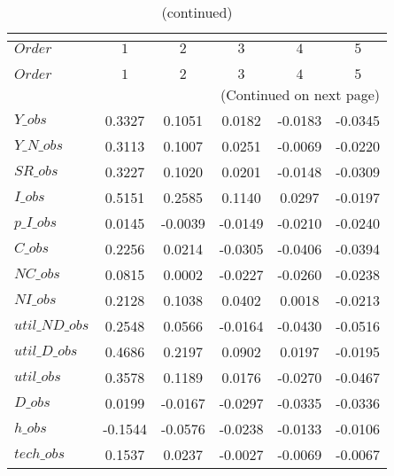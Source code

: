  
\begin{center}
\begin{longtable}{lccccc} 
\caption{COEFFICIENTS OF AUTOCORRELATION}\\
 \label{Table:th_autocorr_matrix}\\
\toprule 
$Order          $	 & 	 $          1$	 & 	 $          2$	 & 	 $          3$	 & 	 $          4$	 & 	 $          5$\\
\midrule \endfirsthead 
\caption{(continued)}\\
 \toprule \\ 
$Order          $	 & 	 $          1$	 & 	 $          2$	 & 	 $          3$	 & 	 $          4$	 & 	 $          5$\\
\midrule \endhead 
\midrule \multicolumn{6}{r}{(Continued on next page)} \\ \bottomrule \endfoot 
\bottomrule \endlastfoot 
$Y\_obs         $	 & 	     0.3327	 & 	     0.1051	 & 	     0.0182	 & 	    -0.0183	 & 	    -0.0345 \\ 
$Y\_N\_obs      $	 & 	     0.3113	 & 	     0.1007	 & 	     0.0251	 & 	    -0.0069	 & 	    -0.0220 \\ 
$SR\_obs        $	 & 	     0.3227	 & 	     0.1020	 & 	     0.0201	 & 	    -0.0148	 & 	    -0.0309 \\ 
$I\_obs         $	 & 	     0.5151	 & 	     0.2585	 & 	     0.1140	 & 	     0.0297	 & 	    -0.0197 \\ 
$p\_I\_obs      $	 & 	     0.0145	 & 	    -0.0039	 & 	    -0.0149	 & 	    -0.0210	 & 	    -0.0240 \\ 
$C\_obs         $	 & 	     0.2256	 & 	     0.0214	 & 	    -0.0305	 & 	    -0.0406	 & 	    -0.0394 \\ 
$NC\_obs        $	 & 	     0.0815	 & 	     0.0002	 & 	    -0.0227	 & 	    -0.0260	 & 	    -0.0238 \\ 
$NI\_obs        $	 & 	     0.2128	 & 	     0.1038	 & 	     0.0402	 & 	     0.0018	 & 	    -0.0213 \\ 
$util\_ND\_obs  $	 & 	     0.2548	 & 	     0.0566	 & 	    -0.0164	 & 	    -0.0430	 & 	    -0.0516 \\ 
$util\_D\_obs   $	 & 	     0.4686	 & 	     0.2197	 & 	     0.0902	 & 	     0.0197	 & 	    -0.0195 \\ 
$util\_obs      $	 & 	     0.3578	 & 	     0.1189	 & 	     0.0176	 & 	    -0.0270	 & 	    -0.0467 \\ 
$D\_obs         $	 & 	     0.0199	 & 	    -0.0167	 & 	    -0.0297	 & 	    -0.0335	 & 	    -0.0336 \\ 
$h\_obs         $	 & 	    -0.1544	 & 	    -0.0576	 & 	    -0.0238	 & 	    -0.0133	 & 	    -0.0106 \\ 
$tech\_obs      $	 & 	     0.1537	 & 	     0.0237	 & 	    -0.0027	 & 	    -0.0069	 & 	    -0.0067 \\ 
\end{longtable}
 \end{center}
